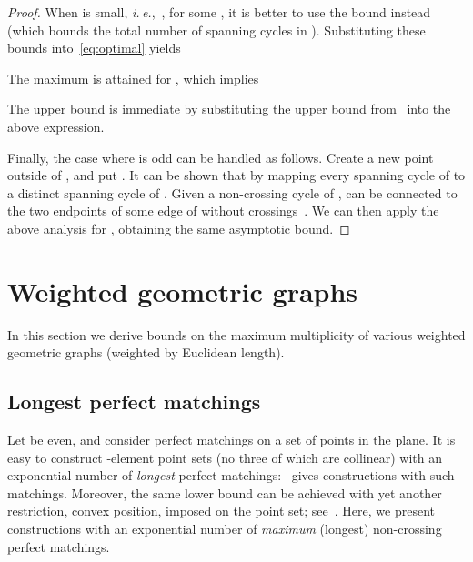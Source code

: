 \documentclass[11pt]{article}
\def\ie{{\it i.\,e.},~}
\begin{document}
\begin{proof}
When  is small, \ie , for some , it is
better to use the bound  instead
(which bounds the total number of spanning cycles in ).
Substituting these bounds into~\eqref{eq:optimal} yields

The maximum is attained for , which implies

The upper bound  is immediate by substituting
the upper bound  from~\cite{SS10} into the above expression.

Finally, the case where  is odd can be handled as follows. Create a new point 
outside of , and put .
It can be shown that  by mapping every spanning cycle of  to
a distinct spanning cycle of . Given a non-crossing cycle  of ,
  can be connected to the two endpoints of some
edge of  without crossings~\cite[Lemma~2.1]{HKRT08}. We can then apply the
above analysis for , obtaining the same asymptotic bound.
\end{proof}


\section {Weighted geometric graphs} \label{sec:weighted}
In this section we derive bounds on the maximum multiplicity of various weighted
geometric graphs (weighted by Euclidean length).

\subsection {Longest perfect matchings}
Let  be even, and consider perfect matchings on a set of 
points in the plane. It is easy to construct -element point sets
(no three of which are collinear) with an exponential number
of {\em longest} perfect matchings:~\cite{D02} gives constructions with
 such matchings.
Moreover, the same lower bound can be achieved with yet another restriction,
convex position, imposed on the point set; see~\cite{D02}.
Here, we present constructions with an exponential number of {\em maximum}
(longest) non-crossing perfect matchings.
\end{document}
